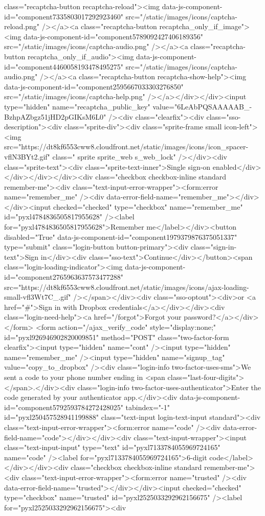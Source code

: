 {class="recaptcha-button recaptcha-reload"><img data-js-component-id="component7335803017292923460" src="/static/images/icons/captcha-reload.png" /></a><a class="recaptcha-button recaptcha_only_if_image"><img data-js-component-id="component5789092427406189356" src="/static/images/icons/captcha-audio.png" /></a><a class="recaptcha-button recaptcha_only_if_audio"><img data-js-component-id="component4460058193478495275" src="/static/images/icons/captcha-audio.png" /></a><a class="recaptcha-button recaptcha-show-help"><img data-js-component-id="component2595667033303276850" src="/static/images/icons/captcha-help.png" /></a></div></div><input type="hidden" name="recaptcha_public_key" value="6LeAbPQSAAAAAB_-BzhpAZbgz51jHD2pGIKsM6L0" /><div class="clearfix"><div class="sso-description"><div class="sprite-div"><div class="sprite-frame small icon-left"><img src="https://dt8kf6553cww8.cloudfront.net/static/images/icons/icon_spacer-vflN3BYt2.gif" class=" sprite sprite_web s_web_lock" /></div><div class="sprite-text"><div class="sprite-text-inner">Single sign-on enabled</div></div></div></div><div class="checkbox checkbox-inline standard remember-me"><div class="text-input-error-wrapper"><form:error name="remember_me" /><div data-error-field-name="remember_me"></div></div><input checked="checked" type="checkbox" name="remember_me" id="pyxl4784836505817955628" /><label for="pyxl4784836505817955628">Remember me</label></div><button disabled="True" data-js-component-id="component1979379876375051337" type="submit" class="login-button button-primary"><div class="sign-in-text">Sign in</div><div class="sso-text">Continue</div></button><span class="login-loading-indicator"><img data-js-component-id="component2765963637573477288" src="https://dt8kf6553cww8.cloudfront.net/static/images/icons/ajax-loading-small-vfl3Wt7C_.gif" /></span></div><div class="sso-optout"><div>or <a href="#">Sign in with Dropbox credentials</a></div></div><div class="login-need-help"><a href="/forgot">Forgot your password?</a></div></form> <form action="/ajax_verify_code" style="display:none;" id="pyxl926946902820009851" method="POST" class="two-factor-form clearfix"><input type="hidden" name="cont" /><input type="hidden" name="remember_me" /><input type="hidden" name="signup_tag" value="copy_to_dropbox" /><div class="login-info two-factor-uses-sms">We sent a code to your phone number ending in <span class="last-four-digits"></span>.</div><div class="login-info two-factor-uses-authenticator">Enter the code generated by your authenticator app.</div><div data-js-component-id="component5792593784272428025" tabindex="-1" id="pyxl250457528941199888" class="text-input login-text-input standard"><div class="text-input-error-wrapper"><form:error name="code" /><div data-error-field-name="code"></div></div><div class="text-input-wrapper"><input class="text-input-input" type="text" id="pyxl7133784055969724165" name="code" /><label for="pyxl7133784055969724165">6-digit code</label></div></div><div class="checkbox checkbox-inline standard remember-me"><div class="text-input-error-wrapper"><form:error name="trusted" /><div data-error-field-name="trusted"></div></div><input checked="checked" type="checkbox" name="trusted" id="pyxl2525033292962156675" /><label for="pyxl2525033292962156675"><div }
